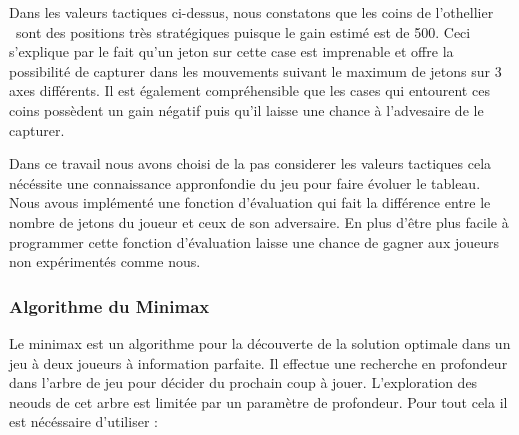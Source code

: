 \documentclass[11pt]{article}
\begin{document}
\begin{table}[h]
  \noindent{}
  \caption{Exemple de valeurs tactiques pour Othello}
\end{table}

Dans les valeurs tactiques ci-dessus, nous constatons que les coins de
l'othellier \ sont des positions très stratégiques puisque le gain
estimé est de 500. Ceci s'explique par le fait qu'un jeton sur cette case
est imprenable et offre la possibilité de capturer dans les mouvements
suivant le maximum de jetons sur 3 axes différents. Il est également
compréhensible que les cases qui entourent ces coins possèdent un gain
négatif puis qu'il laisse une chance à l'advesaire de le capturer.

Dans ce travail nous avons choisi de la pas considerer les valeurs tactiques
cela nécéssite une connaissance appronfondie du jeu pour faire
évoluer le tableau. Nous avous implémenté une fonction
d'évaluation qui fait la différence entre le nombre de jetons du
joueur et ceux de son adversaire. En plus d'être plus facile à
programmer cette fonction d'évaluation laisse une chance de gagner aux
joueurs non expérimentés comme nous.

\subsubsection{Algorithme du Minimax}

Le minimax est un algorithme pour la découverte de la solution optimale
dans un jeu à deux joueurs à information parfaite. Il effectue une
recherche en profondeur dans l'arbre de jeu pour décider du prochain coup
à jouer. L'exploration des neouds de cet arbre est limitée par un
paramètre de profondeur. Pour tout cela il est nécéssaire
d'utiliser :
\end{document}

